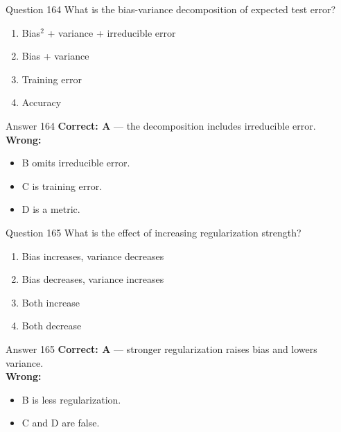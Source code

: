 \documentclass[aspectratio=169,11pt]{beamer}
\begin{document}
	\begin{frame}{Question 164}
		What is the bias-variance decomposition of expected test error?
		\begin{enumerate}[label=\Alph*.]
			\item Bias$^2$ + variance + irreducible error
			\item Bias + variance
			\item Training error
			\item Accuracy
		\end{enumerate}
	\end{frame}
	\begin{frame}{Answer 164}
		\textbf{Correct: A} --- the decomposition includes irreducible error.\\
		\vspace{0.5em}
		\textbf{Wrong:}
		\begin{itemize}
			\item B omits irreducible error.
			\item C is training error.
			\item D is a metric.
		\end{itemize}
	\end{frame}
	
	\begin{frame}{Question 165}
		What is the effect of increasing regularization strength?
		\begin{enumerate}[label=\Alph*.]
			\item Bias increases, variance decreases
			\item Bias decreases, variance increases
			\item Both increase
			\item Both decrease
		\end{enumerate}
	\end{frame}
	\begin{frame}{Answer 165}
		\textbf{Correct: A} --- stronger regularization raises bias and lowers variance.\\
		\vspace{0.5em}
		\textbf{Wrong:}
		\begin{itemize}
			\item B is less regularization.
			\item C and D are false.
		\end{itemize}
	\end{frame}
	
\end{document}
